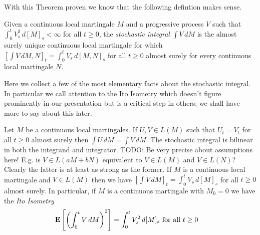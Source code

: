 With this Theorem proven we know that the following defintion makes sense.
\begin{defn}Given a continuous local martingale $M$ and a progressive process $V$ such that $\int_0^t V^2_s \, d[M]_s < \infty$ for all $t \geq 0$, the \emph{stochastic integral} $\int V \, dM$ is the almost surely unique continuous local martingale for which $[\int V \, dM, N]_t = \int_0^t V_s \, d[M,N]_s$ for all $t \geq 0$ almost surely for every continuous local martingale $N$.
\end{defn}

Here we collect a few of the most elementary facts about the stochastic integral.  In particular we call attention to the Ito Isometry which doesn't figure prominently in our presentation but is a critical step in others; we shall have more to say about this later.  
\begin{lem}\label{BasicPropertiesStochasticIntegralContinuousMartingale}Let $M$ be a continuous local martingales.  If $U,V \in L(M)$ such that $U_t=V_t$ for all $t \geq 0$ almost surely then $\int U \, dM = \int V \, dM$.  The stochastic integral is bilinear in both the integrand and integrator.
TODO: Be very precise about assumptions here!  E.g. is $V \in L(aM + bN)$ equivalent to $V \in L(M)$ and $V \in L(N)$?  Clearly the latter is at least as strong as the former.
If $M$ is a continuous local martingale and $V \in L(M)$ then we have $[\int V \, dM]_t = \int_0^t V_s \, d[M]_s$ for all $t \geq 0$ almost surely.  In particular, if $M$ is a continuous martingale with $M_0 = 0$ we have the \emph{Ito Isometry} 
\begin{align*}
\textbf{E}\left[\left(\int_0^t V \, dM\right)^2\right] &= \int_0^t V_s^2 \, d[M]_s \text{ for all $t \geq 0$}
\end{align*}
\end{lem}
